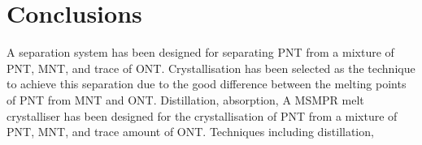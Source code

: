\section{Conclusions}\label{separation conclusions}

A separation system has been designed for separating PNT from a mixture of PNT, MNT, and trace of ONT. Crystallisation has been selected as the technique to achieve this separation due to the good difference between the melting points of PNT from MNT and ONT. Distillation, absorption,  A MSMPR melt crystalliser has been designed for the crystallisation of PNT from a mixture of PNT, MNT, and trace amount of ONT. Techniques including distillation, 